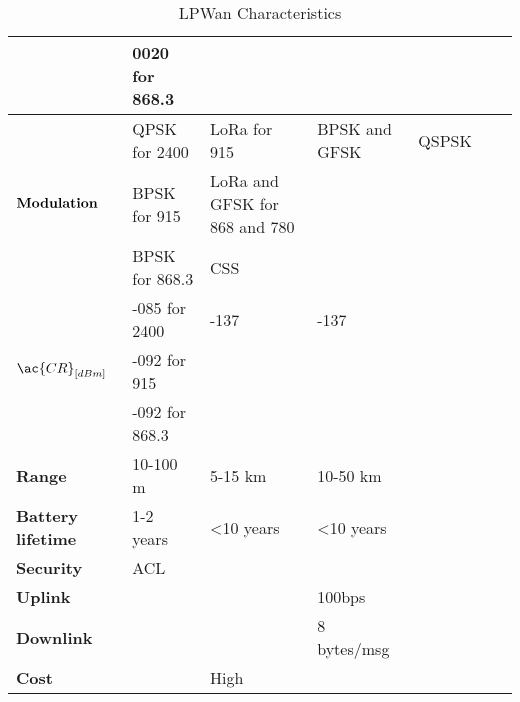\begin{table}[!ht]
\begin{tabulary}{\textwidth}{L|L|L|L|L|L|L}
	\                                 & 0020 for 868.3 &                                 &               &             &                 &                 \\\hline
	  & QPSK for 2400  & LoRa           for 915          & BPSK and GFSK & QSPSK       &                 &                 \\
	\                                 & BPSK for 915   & LoRa and GFSK  for 868  and 780 &               &             &                 &                 \\
	\                                 & BPSK for 868.3 & \ac{CSS}                        &               &             &                 &                 \\\hline
	  & -085 for 2400  & -137                            & -137          &             &                 &                 \\
	\                                 & -092 for 915   &                                 &               &             &                 &                 \\
	\                                 & -092 for 868.3 &                                 &               &             &                 &                 \\\hline
	\bf{Range}                        & 10-100 m       & 5-15 km                         & 10-50 km      &             &                 &                 \\\hline
	\bf{Battery lifetime}             & 1-2 years      & <10 years                       & <10 years     &             &                 &                 \\\hline
	\bf{Security}                     & ACL            &                                 &               &             &                 &                 \\\hline
	\bf{Uplink}                       &                &                                 & 100bps        &             &                 &                 \\\hline
	\bf{Downlink}                     &                &                                 & 8 bytes/msg   &             &                 &                 \\\hline
	\bf{Cost}                         &                & High                            &               &             &                 &                 \\\hline
	\end{tabulary}
	\caption{\label{tab:LPWan_characteristics} LPWan Characteristics \cite{al-kashoash_comparison_2016}}
\end{table}

